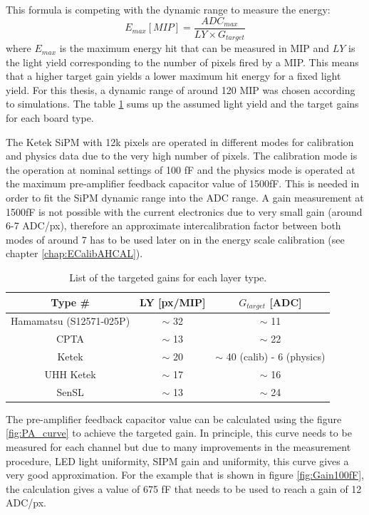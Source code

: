 This formula is competing with the dynamic range to measure the energy:
\begin{equation}
  E_{max} [MIP] = \frac{ADC_{max}}{LY \times G_{target}}
\end{equation}
where $E_{max}$ is the maximum energy hit that can be measured in MIP and $LY$ is the light yield corresponding to the number of pixels fired by a MIP. This means that a higher target gain yields a lower maximum hit energy for a fixed light yield. For this thesis, a dynamic range of around 120 MIP was chosen according to simulations. The table \ref{table:GainTarget_SiPM} sums up the assumed light yield and the target gains for each board type.

The Ketek SiPM with 12k pixels are operated in different modes for calibration and physics data due to the very high number of pixels. The calibration mode is the operation at nominal settings of 100 fF and the physics mode is operated at the maximum pre-amplifier feedback capacitor value of 1500fF. This is needed in order to fit the SiPM dynamic range into the ADC range. A gain measurement at 1500fF is not possible with the current electronics due to very small gain (around 6-7 ADC/px), therefore an approximate intercalibration factor between both modes of around 7 has to be used later on in the energy scale calibration (see chapter \ref{chap:ECalibAHCAL}).

\begin{table}[htb!]
  \centering
  \caption{List of the targeted gains for each layer type.}
  \label{table:GainTarget_SiPM}
  \begin{tabular}{@{} ccc @{}}
    \toprule
    Type \# & LY [px/MIP] & $G_{target}$ [ADC] \\
    \midrule
    Hamamatsu (S12571-025P) & $\sim$ 32 & $\sim$ 11\\
    CPTA & $\sim$ 13 & $\sim$ 22\\
    Ketek & $\sim$ 20 & $\sim$ 40 (calib) - 6 (physics)\\
    UHH Ketek & $\sim$ 17 & $\sim$ 16\\
    SenSL & $\sim$ 13 & $\sim$ 24\\
    \bottomrule
  \end{tabular}
\end{table}

The pre-amplifier feedback capacitor value can be calculated using the figure \ref{fig:PA_curve} to achieve the targeted gain. In principle, this curve needs to be measured for each channel but due to many improvements in the measurement procedure, LED light uniformity, SIPM gain and uniformity, this curve gives a very good approximation. For the example that is shown in figure \ref{fig:Gain100fF}, the calculation gives a value of 675 fF that needs to be used to reach a gain of 12 ADC/px.

